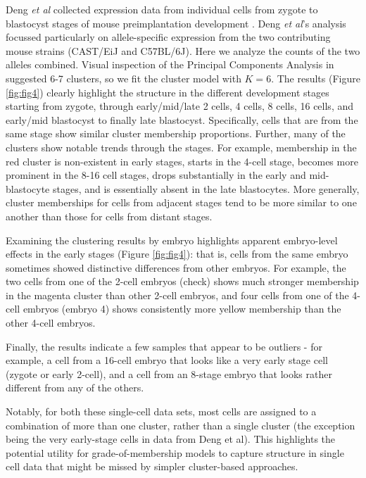 Deng \textit{et al} collected expression data from individual cells from zygote to blastocyst stages of mouse preimplantation development \cite{Deng2014}. Deng \textit{et al}'s analysis focussed particularly on allele-specific expression from the two contributing mouse strains (CAST/EiJ and C57BL/6J). Here we analyze the counts of the two alleles combined. Visual inspection of the Principal Components Analysis in \cite{Deng2014} suggested 6-7 clusters, so we fit the cluster model with $K=6$. 
The results (Figure \ref{fig:fig4}) clearly highlight the structure in the different development stages starting from zygote, through early/mid/late 2 cells, 4 cells, 8 cells, 16 cells, and early/mid blastocyst to finally late blastocyst. Specifically, cells that are from the same stage show similar cluster membership proportions. Further, many of the clusters show notable trends through the stages. For example, 
membership in the red cluster is non-existent in early stages, starts in the 4-cell stage, becomes more prominent in the 8-16 cell stages, drops substantially in the early and mid-blastocyte stages, and is essentially absent in the late blastocytes. More generally, cluster memberships for cells from adjacent stages tend to be more similar to one another than those for cells from distant stages. 

Examining the clustering results by embryo highlights apparent embryo-level effects in the early stages (Figure \ref{fig:fig4}): that is, cells from the same embryo sometimes showed distinctive differences from other embryos. For example, the two cells from one of the 2-cell embryos (check) shows much stronger membership in the magenta cluster than other 2-cell embryos, and four cells from one of the 4-cell embryos (embryo 4) shows consistently more yellow membership than the other 4-cell embryos. 

Finally, the results indicate a few samples that appear to be outliers - for example, a cell from a 16-cell embryo that looks like a very early stage cell (zygote or early 2-cell), and a cell from an 8-stage embryo that looks rather different from any of the others.

Notably, for both these single-cell data sets, most cells are assigned to a combination of more than one cluster, rather than a single cluster (the exception being the very early-stage cells in data from Deng et al). This highlights the potential utility for grade-of-membership models to capture structure in single cell data that might be missed by simpler cluster-based approaches.

